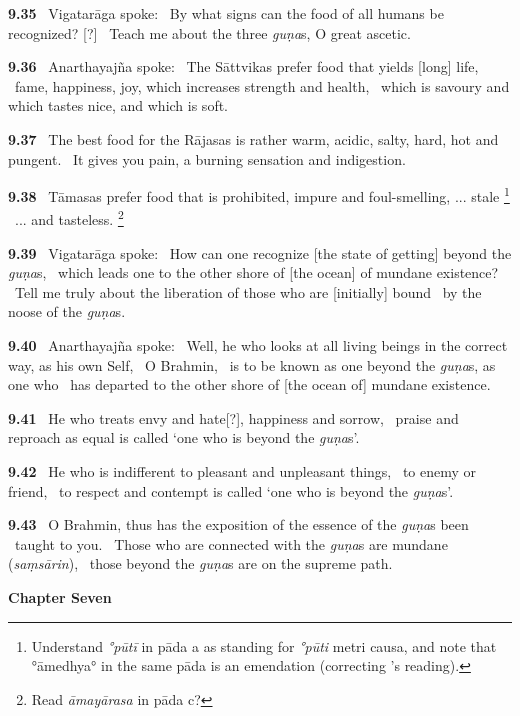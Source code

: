 \documentclass{article}
\newcommand{\skt}[1]{\textit{#1}}
\begin{document}
\textbf{9.35}%
\ Vigatarāga spoke:%
\ By what signs can the food of all humans be recognized? [?]%
\ Teach me about the three \skt{guṇa}s, O great ascetic.%


\textbf{9.36}%
\ Anarthayajña spoke:%
\ The Sāttvikas prefer food that yields [long] life,%
\                  fame, happiness, joy, which increases strength and health,%
\ which is savoury and which tastes nice, and which is soft.%


\textbf{9.37}%
\ The best food for the Rājasas is rather warm, acidic, salty, hard, hot and pungent.%
\ It gives you pain, a burning sensation and indigestion.%


\textbf{9.38}%
\ Tāmasas prefer food that is prohibited, impure and foul-smelling, ... stale%
\footnote{Understand \skt{°pūtī} in pāda a as standing for \skt{°pūti} metri causa, and                 note that °āmedhya° in the same pāda is an emendation (correcting \msNc's reading). }%
\  ... and tasteless.%
\footnote{Read \skt{āmayārasa} in pāda c? }%


\textbf{9.39}%
\ Vigatarāga spoke:%
\ How can one recognize [the state of getting] beyond the \skt{guṇa}s,%
\                 which leads one to the other shore of [the ocean] of mundane existence?%
\ Tell me truly about the liberation of those who are [initially] bound%
\                        by the noose of the \skt{guṇa}s.%


\textbf{9.40}%
\ Anarthayajña spoke:%
\ Well, he who looks at all living beings in the correct way, as his own Self,%
\                         O Brahmin,%
\ is to be known as one beyond the \skt{guṇa}s, as one who%
\                 has departed to the other shore of [the ocean of] mundane existence.%


\textbf{9.41}%
\ He who treats envy and hate[?], happiness and sorrow,%
\ praise and reproach as equal is called `one who is beyond the \skt{guṇa}s'.%


\textbf{9.42}%
\ He who is indifferent to pleasant and unpleasant things,%
\                         to enemy or friend,%
\ to respect and contempt is called `one who is beyond the \skt{guṇa}s'.%


\textbf{9.43}%
\ O Brahmin, thus has the exposition of the essence of the \skt{guṇa}s been%
\                         taught to you.%
\ Those who are connected with the \skt{guṇa}s are mundane (\skt{saṃsārin}),%
\                         those beyond the \skt{guṇa}s are on the supreme path.%
\vfill\pagebreak\begin{center}{\large\textbf{ Chapter Seven 
}}\end{center}
\end{document}
